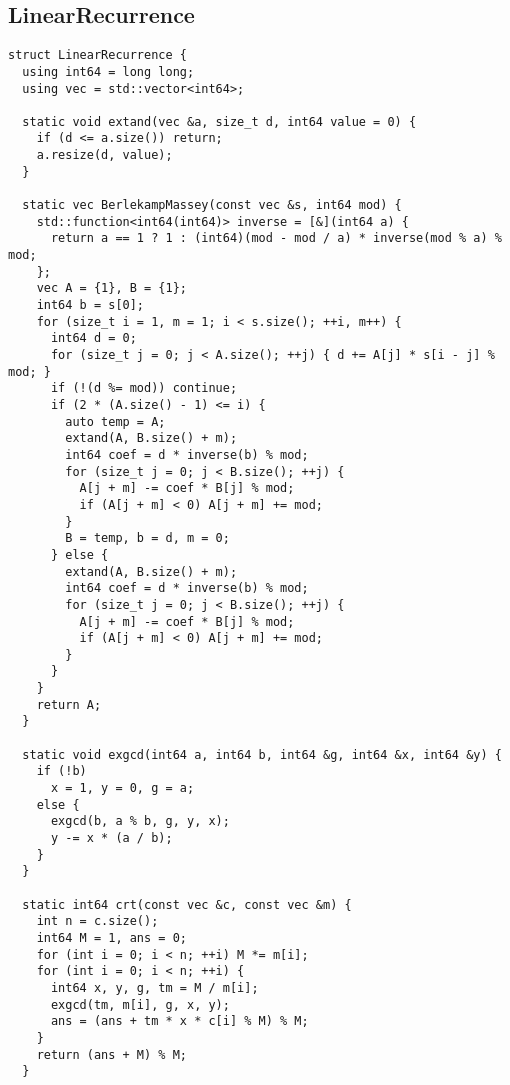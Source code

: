 \documentclass[twoside]{article}
\begin{document}
\subsection{LinearRecurrence}
\begin{lstlisting}
struct LinearRecurrence {
  using int64 = long long;
  using vec = std::vector<int64>;

  static void extand(vec &a, size_t d, int64 value = 0) {
    if (d <= a.size()) return;
    a.resize(d, value);
  }

  static vec BerlekampMassey(const vec &s, int64 mod) {
    std::function<int64(int64)> inverse = [&](int64 a) {
      return a == 1 ? 1 : (int64)(mod - mod / a) * inverse(mod % a) % mod;
    };
    vec A = {1}, B = {1};
    int64 b = s[0];
    for (size_t i = 1, m = 1; i < s.size(); ++i, m++) {
      int64 d = 0;
      for (size_t j = 0; j < A.size(); ++j) { d += A[j] * s[i - j] % mod; }
      if (!(d %= mod)) continue;
      if (2 * (A.size() - 1) <= i) {
        auto temp = A;
        extand(A, B.size() + m);
        int64 coef = d * inverse(b) % mod;
        for (size_t j = 0; j < B.size(); ++j) {
          A[j + m] -= coef * B[j] % mod;
          if (A[j + m] < 0) A[j + m] += mod;
        }
        B = temp, b = d, m = 0;
      } else {
        extand(A, B.size() + m);
        int64 coef = d * inverse(b) % mod;
        for (size_t j = 0; j < B.size(); ++j) {
          A[j + m] -= coef * B[j] % mod;
          if (A[j + m] < 0) A[j + m] += mod;
        }
      }
    }
    return A;
  }

  static void exgcd(int64 a, int64 b, int64 &g, int64 &x, int64 &y) {
    if (!b)
      x = 1, y = 0, g = a;
    else {
      exgcd(b, a % b, g, y, x);
      y -= x * (a / b);
    }
  }

  static int64 crt(const vec &c, const vec &m) {
    int n = c.size();
    int64 M = 1, ans = 0;
    for (int i = 0; i < n; ++i) M *= m[i];
    for (int i = 0; i < n; ++i) {
      int64 x, y, g, tm = M / m[i];
      exgcd(tm, m[i], g, x, y);
      ans = (ans + tm * x * c[i] % M) % M;
    }
    return (ans + M) % M;
  }


\end{lstlisting}
\end{document}
